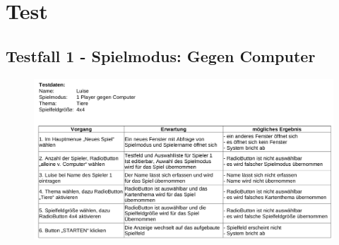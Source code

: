 \clearpage

\chapter{Test}

\section{Testfall 1 - Spielmodus: Gegen Computer}
\begin{figure}[!h]
	\centering
    \includegraphics[width=15cm]{./Testfall1.png}
	\label{layout_gesamt}
\end{figure}
